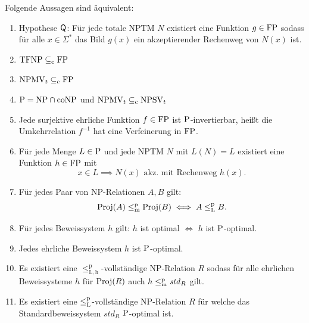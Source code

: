 \begin{theorem}\label{thm:q}
    Folgende Aussagen sind äquivalent:
    \begin{enumerate}[midpenalty=0]
        \item Hypothese $\hQ$: Für jede totale NPTM $N$  existiert eine Funktion $g\in\FP$ sodass für alle $x\in\Sigma^*$ das Bild $g(x)$ ein akzeptierender Rechenweg von $N(x)$ ist.
        \item $\TFNP\subseteqc \FP$
        \item $\mathrm{NPMV}_t\subseteqc \FP$
        \item $\P=\NP\cap\coNP$ und $\mathrm{NPMV}_t\subseteqc \mathrm{NPSV}_t$
        \item Jede surjektive ehrliche Funktion $f\in\FP$ ist $\P$-invertierbar, heißt die Umkehrrelation $f^{-1}$ hat eine Verfeinerung in $\FP$. 
        \item Für jede Menge $L\in \P$  und jede NPTM $N$ mit $L(N)=L$ existiert eine Funktion $h\in \FP$ mit 
            \[ x\in L \implies N(x) \text{ akz. mit Rechenweg $h(x)$}. \]
        \item Für jedes Paar von NP-Relationen $A, B$ gilt:
            \[ \Proj(A) \leqmp \Proj(B) \iff A \leqlp B. \]
        \item Für jedes Beweissystem $h$ gilt: $h$ ist optimal $\iff$ $h$ ist $\P$-optimal. 
        \item Jedes ehrliche Beweissystem $h$ ist $\P$-optimal. 
        \item Es existiert eine $\leq_\mathrm{L,h}^\mathrm p$-vollständige NP-Relation $R$ sodass für alle ehrlichen Beweissysteme $h$ für $\Proj(R)$ auch $h\leqmp \mathit{std}_R$ gilt.
        \item Es existiert eine $\leqlp$-vollständige NP-Relation $R$ für welche das Standardbeweissystem $\mathit{std}_R$ $\P$-optimal ist.
    \end{enumerate}
\end{theorem}
